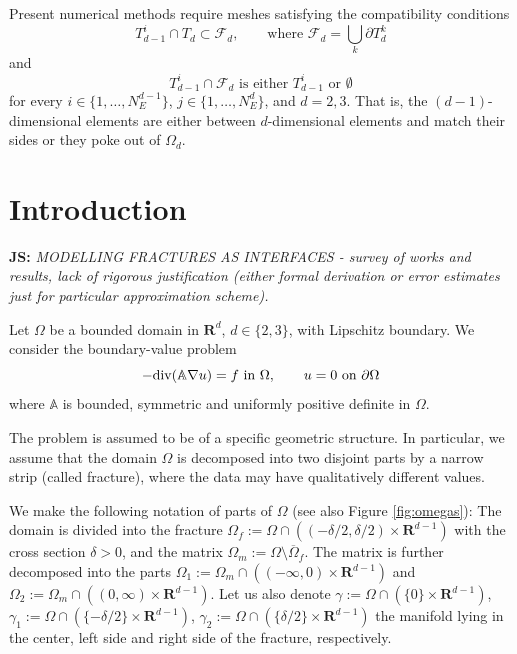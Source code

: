 \documentclass[a4paper]{article}
\def\tn#1{{\mathbb{#1}}}    %
\def\div{{\rm div}}
\def\Real{{\mathbf R}}
\newcommand{\note}[2]{{\color{blue} \textbf{ #1:} \textit{#2}}}
\begin{document}
Present numerical methods require meshes satisfying the compatibility conditions
\begin{equation}
        T_{d-1}^i \cap T_d \subset \mathcal{F}_d,   \qquad \text{where } \mathcal{F}_d = \bigcup_{k} \partial T_{d}^{k}
\end{equation}
and
\begin{equation}
        T_{d-1}^i \cap \mathcal{F}_d    \text{ is either $T_{d-1}^i$ or $\emptyset$}    
\end{equation}
for every $i\in\{1,\dots, N_{E}^{d-1}\}$, $j\in\{1,\dots,N_{E}^{d}\}$,  and $d=2,3$. That is, the $(d-1)$-dimensional elements are either between $d$-dimensional elements and
match their sides or they poke out of $\Omega_d$. 









\section{Introduction}

\note{JS}{
MODELLING FRACTURES AS INTERFACES - survey of works and results, lack of rigorous justification (either formal derivation or error estimates just for particular approximation scheme).
}


Let $\Omega$ be a bounded domain in $\Real^d$, $d\in\{2,3\}$, with Lipschitz boundary.
We consider the boundary-value problem
\begin{equation}
\label{eq:global_pde}
-\div(\tn A\nabla u) = f \mbox{ in }\Omega,\qquad
u=0\mbox{ on }\partial\Omega
\end{equation}
where $\tn A$ is bounded, symmetric and uniformly positive definite in $\Omega$.

The problem is assumed to be of a specific geometric structure.
In particular, we assume that the domain $\Omega$ is decomposed into two disjoint parts by a narrow strip (called fracture), where the data may have qualitatively different values.

We make the following notation of parts of $\Omega$ (see also Figure \ref{fig:omegas}):
The domain is divided into the fracture $\Omega_f:=\Omega\cap ((-\delta/2,\delta/2)\times\Real^{d-1})$ with the cross section $\delta>0$, and the matrix $\Omega_m:=\Omega\setminus\overline\Omega_f$.
The matrix is further decomposed into the parts $\Omega_1:=\Omega_m\cap ((-\infty,0)\times \Real^{d-1})$ and $\Omega_2:=\Omega_m\cap ((0,\infty)\times \Real^{d-1})$.
Let us also denote $\gamma:=\Omega\cap(\{0\}\times\Real^{d-1})$, $\gamma_1:=\Omega\cap(\{-\delta/2\}\times\Real^{d-1})$, $\gamma_2:=\Omega\cap(\{\delta/2\}\times\Real^{d-1})$ the manifold lying in the center, left side and right side of the fracture, respectively.
\end{document}
